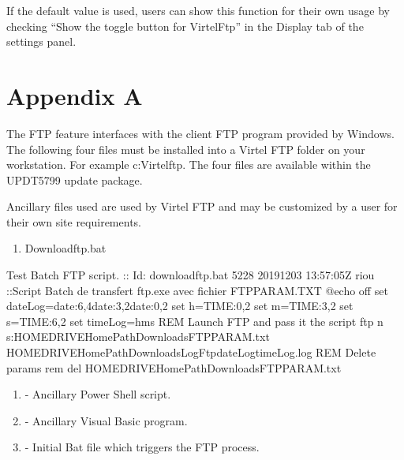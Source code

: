 \documentclass[letterpaper,10pt,english]{sphinxmanual}
\begin{document}
If the default value is used, users can show this function for their own usage by checking “Show the toggle button for VirtelFtp” in the Display tab of the settings panel.


\chapter{Appendix A}
\label{\detokenize{TN201905:appendix-a}}
The FTP feature interfaces with the client FTP program provided by Windows. The following four files must be installed into a Virtel FTP folder on your workstation. For example c:Virtelftp. The four files are available within the UPDT5799 update package.

Ancillary files used are used by Virtel FTP and may be customized by a user for their own site requirements.
\begin{enumerate}
\def\theenumi{\arabic{enumi}}
\def\labelenumi{\theenumi .}
\makeatletter\def\p@enumii{\p@enumi \theenumi .}\makeatother
\item {} 
Downloadftp.bat

\end{enumerate}

\begin{sphinxVerbatim}[commandchars=\\\{\}]
Test Batch FTP script.
:: \PYGZdl{}Id: downloadftp.bat 5228 2019\PYGZhy{}12\PYGZhy{}03 13:57:05Z riou \PYGZdl{}
::Script Batch de transfert ftp.exe avec fichier FTPPARAM.TXT
@echo off
set dateLog=\PYGZpc{}date:\PYGZti{}6,4\PYGZpc{}\PYGZpc{}date:\PYGZti{}3,2\PYGZpc{}\PYGZpc{}date:\PYGZti{}0,2\PYGZpc{}
set h=\PYGZpc{}TIME:\PYGZti{}0,2\PYGZpc{}
set m=\PYGZpc{}TIME:\PYGZti{}3,2\PYGZpc{}
set s=\PYGZpc{}TIME:\PYGZti{}6,2\PYGZpc{}
set timeLog=\PYGZpc{}h\PYGZpc{}\PYGZus{}\PYGZpc{}m\PYGZpc{}\PYGZus{}\PYGZpc{}s\PYGZpc{}
REM Launch FTP and pass it the  script
ftp \PYGZhy{}n \PYGZhy{}s:\PYGZpc{}HOMEDRIVE\PYGZpc{}\PYGZpc{}HomePath\PYGZpc{}\PYGZbs{}Downloads\PYGZbs{}FTPPARAM.txt \PYGZgt{}\PYGZpc{}HOMEDRIVE\PYGZpc{}\PYGZpc{}HomePath\PYGZpc{}\PYGZbs{}Downloads\PYGZbs{}Log\PYGZus{}Ftp\PYGZus{}\PYGZpc{}dateLog\PYGZpc{}\PYGZus{}\PYGZpc{}timeLog\PYGZpc{}.log
REM Delete params
rem del \PYGZpc{}HOMEDRIVE\PYGZpc{}\PYGZpc{}HomePath\PYGZpc{}\PYGZbs{}Downloads\PYGZbs{}FTPPARAM.txt
\end{sphinxVerbatim}
\begin{enumerate}
\def\theenumi{\arabic{enumi}}
\def\labelenumi{\theenumi .}
\makeatletter\def\p@enumii{\p@enumi \theenumi .}\makeatother
\item {} 
 - Ancillary Power Shell script.

\item {} 
 - Ancillary Visual Basic program.

\item {} 
 - Initial Bat file which triggers the FTP process.

\end{enumerate}
\end{document}
